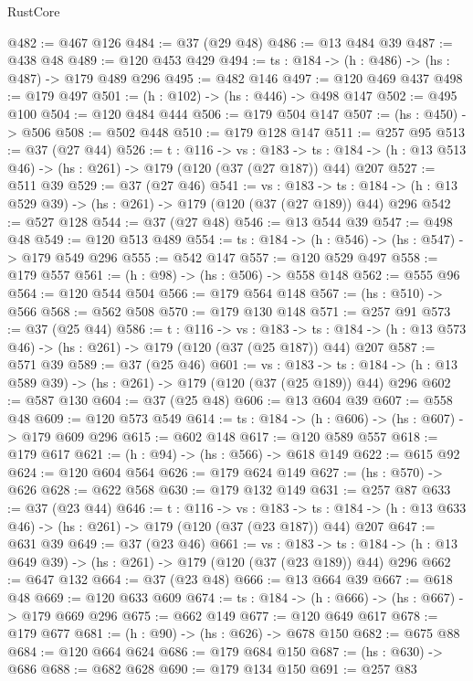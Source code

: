\begin{lexlean}{RustCore}
\begin{coremodule}
@482 := @467 @126
@484 := @37 (@29 @48)
@486 := @13 @484 @39
@487 := @438 @48
@489 := @120 @453 @429
@494 := {ts : @184} -> (h : @486) -> (hs : @487) -> @179 @489 @296
@495 := @482 @146
@497 := @120 @469 @437
@498 := @179 @497
@501 := (h : @102) -> (hs : @446) -> @498 @147
@502 := @495 @100
@504 := @120 @484 @444
@506 := @179 @504 @147
@507 := (hs : @450) -> @506
@508 := @502 @448
@510 := @179 @128 @147
@511 := @257 @95
@513 := @37 (@27 @44)
@526 := {t : @116} ->
  {vs : @183} ->
  {ts : @184} -> (h : @13 @513 @46) -> (hs : @261) -> @179 (@120 (@37 (@27 @187)) @44) @207
@527 := @511 @39
@529 := @37 (@27 @46)
@541 := {vs : @183} ->
  {ts : @184} -> (h : @13 @529 @39) -> (hs : @261) -> @179 (@120 (@37 (@27 @189)) @44) @296
@542 := @527 @128
@544 := @37 (@27 @48)
@546 := @13 @544 @39
@547 := @498 @48
@549 := @120 @513 @489
@554 := {ts : @184} -> (h : @546) -> (hs : @547) -> @179 @549 @296
@555 := @542 @147
@557 := @120 @529 @497
@558 := @179 @557
@561 := (h : @98) -> (hs : @506) -> @558 @148
@562 := @555 @96
@564 := @120 @544 @504
@566 := @179 @564 @148
@567 := (hs : @510) -> @566
@568 := @562 @508
@570 := @179 @130 @148
@571 := @257 @91
@573 := @37 (@25 @44)
@586 := {t : @116} ->
  {vs : @183} ->
  {ts : @184} -> (h : @13 @573 @46) -> (hs : @261) -> @179 (@120 (@37 (@25 @187)) @44) @207
@587 := @571 @39
@589 := @37 (@25 @46)
@601 := {vs : @183} ->
  {ts : @184} -> (h : @13 @589 @39) -> (hs : @261) -> @179 (@120 (@37 (@25 @189)) @44) @296
@602 := @587 @130
@604 := @37 (@25 @48)
@606 := @13 @604 @39
@607 := @558 @48
@609 := @120 @573 @549
@614 := {ts : @184} -> (h : @606) -> (hs : @607) -> @179 @609 @296
@615 := @602 @148
@617 := @120 @589 @557
@618 := @179 @617
@621 := (h : @94) -> (hs : @566) -> @618 @149
@622 := @615 @92
@624 := @120 @604 @564
@626 := @179 @624 @149
@627 := (hs : @570) -> @626
@628 := @622 @568
@630 := @179 @132 @149
@631 := @257 @87
@633 := @37 (@23 @44)
@646 := {t : @116} ->
  {vs : @183} ->
  {ts : @184} -> (h : @13 @633 @46) -> (hs : @261) -> @179 (@120 (@37 (@23 @187)) @44) @207
@647 := @631 @39
@649 := @37 (@23 @46)
@661 := {vs : @183} ->
  {ts : @184} -> (h : @13 @649 @39) -> (hs : @261) -> @179 (@120 (@37 (@23 @189)) @44) @296
@662 := @647 @132
@664 := @37 (@23 @48)
@666 := @13 @664 @39
@667 := @618 @48
@669 := @120 @633 @609
@674 := {ts : @184} -> (h : @666) -> (hs : @667) -> @179 @669 @296
@675 := @662 @149
@677 := @120 @649 @617
@678 := @179 @677
@681 := (h : @90) -> (hs : @626) -> @678 @150
@682 := @675 @88
@684 := @120 @664 @624
@686 := @179 @684 @150
@687 := (hs : @630) -> @686
@688 := @682 @628
@690 := @179 @134 @150
@691 := @257 @83

\end{coremodule}
\end{lexlean}
